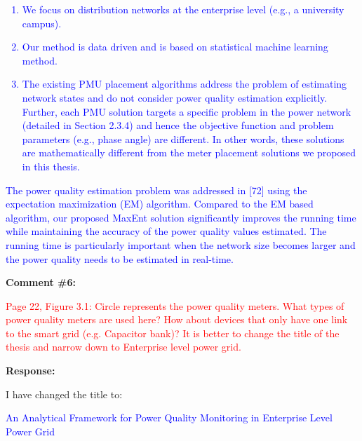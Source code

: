 \documentclass[journal]{IEEEtran}
\begin{document}
\vspace{-1em}
\begin{adjustwidth}{3.5em}{0pt}
\noindent\textcolor{blue}{
\begin{enumerate}
\item We focus on distribution networks at the enterprise level (e.g., a university
campus).
\item Our method is data driven and is based on statistical machine learning method.
\item The existing PMU placement algorithms address the problem of estimating network states and do not consider power quality estimation explicitly. Further, each PMU solution targets a specific problem in the power network (detailed in Section 2.3.4) and hence the objective function and problem parameters (e.g., phase angle) are different. In other words, these solutions are mathematically different from the meter placement solutions we proposed in this thesis.
\end{enumerate}
}
\end{adjustwidth}

\begin{adjustwidth}{2.5em}{0pt}
\noindent\textcolor{blue}{The power quality estimation problem was addressed in [72] using the expectation maximization (EM) algorithm. Compared to the EM based algorithm, our proposed MaxEnt solution significantly improves the running time while maintaining the accuracy of the power quality values estimated. The running time is particularly important when the network size becomes larger and the power quality needs to be estimated in real-time.}
\end{adjustwidth}



\vspace{30pt}
\textbf{Comment \#6:}
\begin{adjustwidth}{2.5em}{0pt}
\singlespacing \vspace{-10pt}
\textcolor{red}{Page 22, Figure 3.1: Circle represents the power quality meters. What types of power quality meters are used here? How about devices that only have one link to the smart grid (e.g. Capacitor bank)? It is better to change the title of the thesis and narrow down to Enterprise level power grid.}
\end{adjustwidth}

\vspace{5pt}
\textbf{Response:}
\begin{adjustwidth}{2.5em}{0pt}
I have changed the title to:

\vspace{5pt}
\noindent\textcolor{blue}{An Analytical Framework for Power Quality Monitoring in Enterprise Level Power Grid}
\end{adjustwidth}
\end{document}
